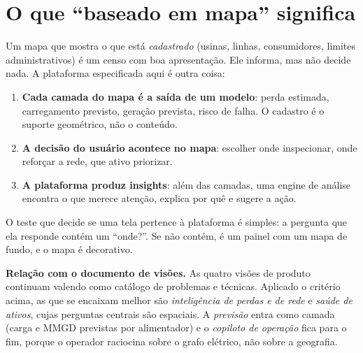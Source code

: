 \documentclass[10pt,a4paper,oneside]{article}
\begin{document}
\rosto

\begin{abstract}
Este documento especifica a plataforma que resulta das visões de produto de
\emph{Aprendizado de Máquina e Aprendizado Profundo no Setor Energético}
quando se impõem dois requisitos: a
plataforma é \textbf{baseada em mapa} e produz \textbf{insights} como saída,
por meio de uma engine de análise. O documento define o que esses requisitos
significam na prática, como o usuário interage com a plataforma para obter
uma saída, o que a engine de análise calcula e como os componentes se
organizam. Os exemplos usam uma distribuidora como cliente, que é a hipótese
de trabalho; a escolha do cliente continua em aberto
(seção~\ref{sec:abertas}).
\end{abstract}

\tableofcontents
\newpage

\section{O que ``baseado em mapa'' significa}

Um mapa que mostra o que está \emph{cadastrado} (usinas, linhas, consumidores,
limites administrativos) é um censo com boa apresentação. Ele informa, mas
não decide nada. A plataforma especificada aqui é outra coisa:

\begin{enumerate}
  \item \textbf{Cada camada do mapa é a saída de um modelo}: perda estimada,
    carregamento previsto, geração prevista, risco de falha. O cadastro é o
    suporte geométrico, não o conteúdo.
  \item \textbf{A decisão do usuário acontece no mapa}: escolher onde
    inspecionar, onde reforçar a rede, que ativo priorizar.
  \item \textbf{A plataforma produz insights}: além das camadas, uma engine de
    análise encontra o que merece atenção, explica por quê e sugere a ação.
\end{enumerate}

O teste que decide se uma tela pertence à plataforma é simples: a pergunta que
ela responde contém um ``onde?''. Se não contém, é um painel com um mapa de
fundo, e o mapa é decorativo.

\begin{nota}
\textbf{Relação com o documento de visões.} As quatro visões de produto
continuam valendo como catálogo de problemas e
técnicas. Aplicado o critério acima, as que se encaixam melhor são
\emph{inteligência de perdas e de rede} e \emph{saúde de ativos}, cujas
perguntas centrais são espaciais. A \emph{previsão} entra como camada (carga e
MMGD previstas por alimentador) e o \emph{copiloto de operação} fica para o
fim, porque o operador raciocina sobre o grafo elétrico, não sobre a geografia.
\end{nota}
\end{document}
